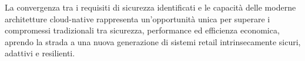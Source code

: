 La convergenza tra i requisiti di sicurezza identificati e le capacità delle moderne architetture cloud-native rappresenta un'opportunità unica per superare i compromessi tradizionali tra sicurezza, performance ed efficienza economica, aprendo la strada a una nuova generazione di sistemi retail intrinsecamente sicuri, adattivi e resilienti.

\clearpage
\printbibliography[
    heading=subbibliography, 
    title={Riferimenti Bibliografici del Capitolo 2},
]

\endrefsection